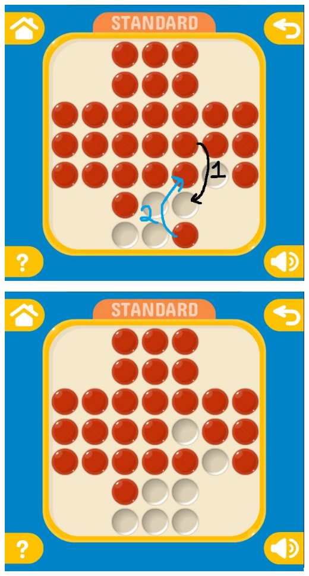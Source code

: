 \documentclass[10pt,a4paper]{report}
\begin{document}
\begin{center}
	\includegraphics[scale=.3]{7.jpg} \hspace{6cm} 
	
	\includegraphics[scale=.3]{8.jpg} \hspace{6cm}
\end{center}
\end{document}
